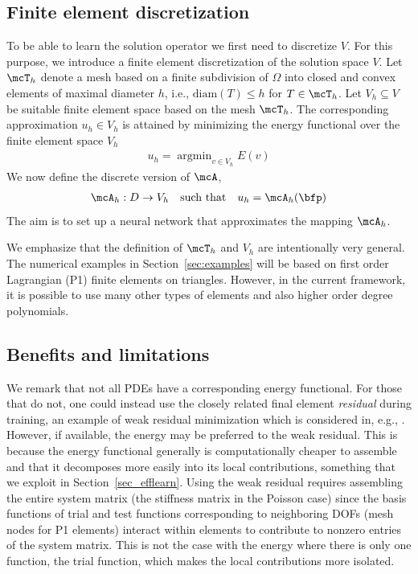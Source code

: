 \documentclass[12pt]{article}
\DeclareMathOperator*{\argmin}{\arg\min}
\begin{document}
\subsection{Finite element discretization}
To be able to learn the solution operator we first need to discretize $V$. For this purpose, we introduce a finite element discretization of the solution space $V$. Let $\mcT_h$ denote a mesh based on a finite subdivision of $\Omega$ into closed and convex elements of maximal diameter $h$, i.e., $\mathrm{diam}(T) \leq h$ for $T\in \mcT_h$. Let $V_h \subseteq V$ be suitable finite element space based on the mesh $\mcT_h$. The corresponding approximation $u_h \in V_h$ is attained by minimizing the energy functional over the finite element space $V_h$
\begin{align}
	u_h = \argmin_{v \in V_h} E(v) \label{min_problem_fem}
\end{align}
We now define the discrete version of $\mcA$,
\begin{align}
	\mcA_h:D \to V_h \quad \text{such that} \quad u_h = \mcA_h(\bfp) \label{operator_fem}
\end{align}
The aim is to set up a neural network that approximates the mapping $\mcA_h$.

\begin{rem}
	We emphasize that the definition of $\mcT_h$ and $V_h$ are intentionally very general. The numerical examples in Section~\ref{sec:examples} will be based on first order Lagrangian (P1) finite elements on triangles. However, in the current framework, it is possible to use many other types of elements and also higher order degree polynomials.
\end{rem}

\subsection{Benefits and limitations}
We remark that not all PDEs have a corresponding energy functional. For those that do not, one could instead use the closely related final element \emph{residual} during training, an example of weak residual minimization which is considered in, e.g., \cite{varnet_2020, berrone_2022}. However, if available, the energy may be preferred to the weak residual. This is because the energy functional generally is computationally cheaper to assemble and that it decomposes more easily into its local contributions, something that we exploit in Section~\ref{sec_efflearn}. Using the weak residual requires assembling the entire system matrix (the stiffness matrix in the Poisson case) since the basis functions of trial and test functions corresponding to neighboring DOFs (mesh nodes for P1 elements) interact within elements to contribute to nonzero entries of the system matrix. This is not the case with the energy where there is only one function, the trial function, which makes the local contributions more isolated.
\end{document}
